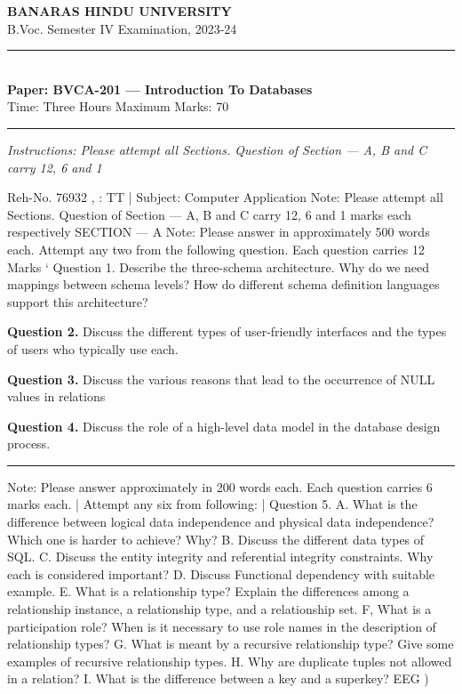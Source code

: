 \documentclass[11pt,a4paper]{article}
\begin{document}
\begin{center}
  {\large\bfseries BANARAS HINDU UNIVERSITY}\\[2pt]
  {\normalsize B.Voc. Semester IV Examination, 2023-24}\\[6pt]
  \rule{0.8\linewidth}{0.5pt}\\[6pt]
  {\large\bfseries Paper: BVCA-201 --- Introduction To Databases}\\[4pt]
  {\normalsize Time: Three Hours \hfill Maximum Marks: 70}
\end{center}

\rule{\linewidth}{0.4pt}

\smallskip
\noindent\textit{Instructions: Please attempt all Sections. Question of Section — A, B and C carry 12, 6 and 1}

\bigskip

Reh-No. 76932 ,
: TT |
Subject: Computer Application
Note: Please attempt all Sections. Question of Section — A, B and C carry 12, 6 and 1
marks each respectively
SECTION --- A
Note: Please answer in approximately 500 words each. Attempt any two from the following
question. Each question carries 12 Marks
‘ Question 1. Describe the three-schema architecture. Why do we need mappings between
schema levels? How do different schema definition languages support this architecture?

\medskip\noindent\textbf{Question 2.} Discuss the different types of user-friendly interfaces and the types of users who
typically use each.

\medskip\noindent\textbf{Question 3.} Discuss the various reasons that lead to the occurrence of NULL values in
relations

\medskip\noindent\textbf{Question 4.} Discuss the role of a high-level data model in the database design process.

\bigskip{}
\rule{\linewidth}{0.4pt}\smallskip

Note: Please answer approximately in 200 words each. Each question carries 6 marks each.
| Attempt any six from following:
| Question 5.
A. What is the difference between logical data independence and physical data
independence? Which one is harder to achieve? Why?
B. Discuss the different data types of SQL.
C. Discuss the entity integrity and referential integrity constraints. Why each is considered
important?
D. Discuss Functional dependency with suitable example.
E. What is a relationship type? Explain the differences among a relationship instance, a
relationship type, and a relationship set.
F, What is a participation role? When is it necessary to use role names in the description of
relationship types?
G. What is meant by a recursive relationship type? Give some examples of recursive
relationship types.
H. Why are duplicate tuples not allowed in a relation?
I. What is the difference between a key and a superkey?
EEG
)
\end{document}
